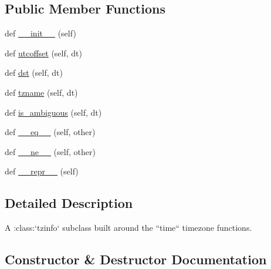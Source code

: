 \subsection*{Public Member Functions}
\begin{DoxyCompactItemize}
\item 
def \hyperlink{classdateutil_1_1tz_1_1tz_1_1tzlocal_a466e75232b36fd339827d70e418eba7c}{\+\_\+\+\_\+init\+\_\+\+\_\+} (self)
\item 
def \hyperlink{classdateutil_1_1tz_1_1tz_1_1tzlocal_ad1f908257b3f40c687a25bc6aba24579}{utcoffset} (self, dt)
\item 
def \hyperlink{classdateutil_1_1tz_1_1tz_1_1tzlocal_a082400afb70ad1204bf721ee11a40bc5}{dst} (self, dt)
\item 
def \hyperlink{classdateutil_1_1tz_1_1tz_1_1tzlocal_a62b0c533e3cafa39dfbce5f1d8ef7a6a}{tzname} (self, dt)
\item 
def \hyperlink{classdateutil_1_1tz_1_1tz_1_1tzlocal_a5d3804d2c977eaf14ccbd3a8d14240fe}{is\+\_\+ambiguous} (self, dt)
\item 
def \hyperlink{classdateutil_1_1tz_1_1tz_1_1tzlocal_a0d21dffc29825959b2c37df26dc3bfb8}{\+\_\+\+\_\+eq\+\_\+\+\_\+} (self, other)
\item 
def \hyperlink{classdateutil_1_1tz_1_1tz_1_1tzlocal_a31974d1b129163492cdfdca783b98cab}{\+\_\+\+\_\+ne\+\_\+\+\_\+} (self, other)
\item 
def \hyperlink{classdateutil_1_1tz_1_1tz_1_1tzlocal_ab964f38a82a0544c05a239a7a4d21935}{\+\_\+\+\_\+repr\+\_\+\+\_\+} (self)
\end{DoxyCompactItemize}


\subsection{Detailed Description}
\begin{DoxyVerb}A :class:`tzinfo` subclass built around the ``time`` timezone functions.
\end{DoxyVerb}
 

\subsection{Constructor \& Destructor Documentation}
\mbox{\label{classdateutil_1_1tz_1_1tz_1_1tzlocal_a466e75232b36fd339827d70e418eba7c}} 

